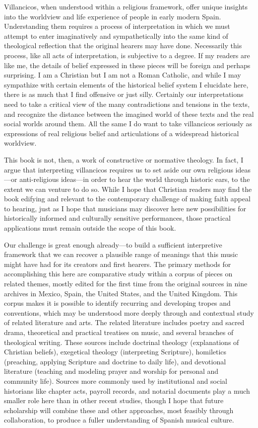 Villancicos, when understood within a religious framework, offer unique
insights into the worldview and life experience of people in early modern
Spain.
Understanding them requires a process of interpretation in which we must
attempt to enter imaginatively and sympathetically into the same kind of
theological reflection that the original hearers may have done.
Necessarily this process, like all acts of interpretation, is subjective to a
degree.
If my readers are like me, the details of belief expressed in these pieces will 
be foreign and perhaps surprising.
I am a Christian but I am not a Roman Catholic, and while I may sympathize with
certain elements of the historical belief system I elucidate here, there is as
much that I find offensive or just silly.
Certainly our interpretations need to take a critical view of the many
contradictions and tensions in the texts, and recognize the distance between
the imagined world of these texts and the real social worlds around them. 
All the same I do want to take villancicos seriously as expressions of real
religious belief and articulations of a widespread historical worldview.

This book is not, then, a work of constructive or normative theology.
In fact, I argue that interpreting villancicos requires us to set aside our own
religious ideas---or anti-religious ideas---in order to hear the world through
historic ears, to the extent we can venture to do so.%
While I hope that Christian readers may find the book edifying and relevant to
the contemporary challenge of making faith appeal to hearing, just as I hope
that musicians may discover here new possibilities for historically informed
and culturally sensitive performances, those practical applications must
remain outside the scope of this book.

Our challenge is great enough already---to build a sufficient interpretive
framework that we can recover a plausible range of meanings that this music
might have had for its creators and first hearers.
The primary methods for accomplishing this here are comparative study within a
corpus of pieces on related themes, mostly edited for the first time from the
original sources in nine archives in Mexico, Spain, the United States, and the
United Kingdom.
This corpus makes it is possible to identify recurring and developing tropes
and conventions, which may be understood more deeply through and contextual
study of related literature and arts.
The related literature includes poetry and sacred drama, theoretical and
practical treatises on music, and several branches of theological writing.
These sources include doctrinal theology (explanations of Christian beliefs),
exegetical theology (interpreting Scripture), homiletics (preaching, applying
Scripture and doctrine to daily life), and devotional literature (teaching and
modeling prayer and worship for personal and community life).
Sources more commonly used by institutional and social historians like chapter
acts, payroll records, and notarial documents play a much smaller role here
than in other recent studies, though I hope that future scholarship will
combine these and other approaches, most feasibly through collaboration, to
produce a fuller understanding of Spanish musical culture.

